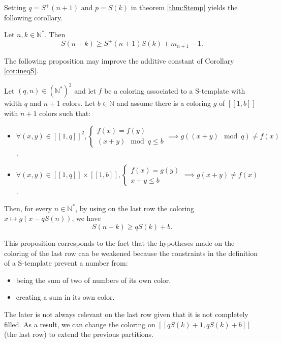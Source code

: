 Setting \(q = S^+(n+1)\) and \(p = S(k)\) in theorem \ref{thm:Stemp} yields the following corollary.

\begin{corollary}
\label{cor:ineqS}
	Let \(n, k \in \mathbb{N}^*\). Then
	\[ S(n+k) \geqslant S^+(n+1)S(k) + m_{n+1} - 1.\]
\end{corollary}

The following proposition may improve the additive constant of Corollary \ref{cor:ineqS}.

\begin{proposition}
\label{prop:rafStemp}
Let \((q, n) \in \left(\mathbb{N}^* \right)^2\) and let \(f\) be a coloring associated to a S-template with width \(q\) and \(n+1\) 
colors. Let \(b \in \mathbb{N}\) and assume there is a coloring \(g\) of 
\([\![1, b]\!]\) with \(n+1\) colors such that:
	
\begin{itemize}
\item \(\forall (x, y) \in [\![1, q]\!]^2, \left\{
	\begin{array}{l}
		f(x) = f(y) \\
		(x + y) \mod q \leqslant b
	\end{array}
	\right. \implies g((x + y) \mod q) \neq f(x)\),
\item \(\forall (x, y) \in [\![1, q]\!] \times  [\![1, b]\!],  \left\{
	\begin{array}{l}
		f(x) = g(y) \\
		x + y \leqslant b
	\end{array}
	\right. \implies g(x + y) \neq f(x)\).
\end{itemize}
	
Then, for every \(n \in \mathbb{N}^*\), by using on the last row the coloring \(x \longmapsto g(x - q S(n))\), we have
\[ S(n+k) \geqslant q S(k) + b.\]
\end{proposition}
This proposition corresponds to the fact that the hypotheses made on the coloring of the last row can be weakened because 
the constraints in the definition of a S-template prevent a number from: 
\begin{itemize}
\item being the sum of two of numbers of its own color. 
\item creating a sum in its own color. 
\end{itemize}
The later is not always relevant on the last row given that it is not completely filled.
As a result, we can change the coloring on \([\![ q S(k) + 1,  q S(k) + b]\!]\) (the last row) to extend the previous partitions.
\newline

